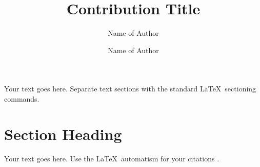 %
%
%
%









%

\title*{Contribution Title}
\author{Name of Author\and
Name of Author}
%
%
\maketitle

Your text goes here. Separate text sections with the standard \LaTeX\
sectioning commands.

\section{Section Heading}
\label{sec:1}
Your text goes here. Use the \LaTeX\ automatism for your citations
\cite{monograph}.

